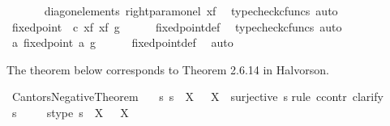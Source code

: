 \begin{isabellebody}
\ \ \ \ \isamarkupfalse%
\ \ diag{\isacharunderscore}{\kern0pt}on{\isacharunderscore}{\kern0pt}elements\ right{\isacharunderscore}{\kern0pt}param{\isacharunderscore}{\kern0pt}on{\isacharunderscore}{\kern0pt}el\ x{\isacharunderscore}{\kern0pt}f\ \isamarkupfalse%
\ {\isacharparenleft}{\kern0pt}typecheck{\isacharunderscore}{\kern0pt}cfuncs{\isacharcomma}{\kern0pt}\ auto{\isacharparenright}{\kern0pt}\isanewline
\ \ \isamarkupfalse%
\ \isamarkupfalse%
\ {\isachardoublequoteopen}fixed{\isacharunderscore}{\kern0pt}point\ {\isacharparenleft}{\kern0pt}{\isasymphi}\ {\isasymcirc}\isactrlsub c\ {\isasymlangle}x{\isacharunderscore}{\kern0pt}f{\isacharcomma}{\kern0pt}\ x{\isacharunderscore}{\kern0pt}f{\isasymrangle}{\isacharparenright}{\kern0pt}\ g{\isachardoublequoteclose}\isanewline
\ \ \ \ \isamarkupfalse%
\ fixed{\isacharunderscore}{\kern0pt}point{\isacharunderscore}{\kern0pt}def{}\ \isamarkupfalse%
\ {\isacharparenleft}{\kern0pt}typecheck{\isacharunderscore}{\kern0pt}cfuncs{\isacharcomma}{\kern0pt}\ auto{\isacharparenright}{\kern0pt}\isanewline
\ \ \isamarkupfalse%
\ \isamarkupfalse%
\ {\isachardoublequoteopen}{\isasymexists}a{\isachardot}{\kern0pt}\ fixed{\isacharunderscore}{\kern0pt}point\ a\ g{\isachardoublequoteclose}\isanewline
\ \ \ \ \isamarkupfalse%
\ fixed{\isacharunderscore}{\kern0pt}point{\isacharunderscore}{\kern0pt}def\ \isamarkupfalse%
\ auto\isanewline
{}\isamarkupfalse%
%
\endisatagproof
{\isafoldproof}%
%
\isadelimproof
%
\endisadelimproof
%
\begin{isamarkuptext}%
The theorem below corresponds to Theorem 2.6.14 in Halvorson.%
\end{isamarkuptext}\isamarkuptrue%
\isamarkupfalse%
\ Cantors{\isacharunderscore}{\kern0pt}Negative{\isacharunderscore}{\kern0pt}Theorem{\isacharcolon}{\kern0pt}\isanewline
\ \ {\isachardoublequoteopen}{\isasymnexists}\ s{\isachardot}{\kern0pt}\ s\ {\isacharcolon}{\kern0pt}\ X\ {\isasymrightarrow}\ {\isasymP}\ X\ {\isasymand}\ surjective\ s{\isachardoublequoteclose}\isanewline
%
\isadelimproof
%
\endisadelimproof
%
\isatagproof
{}\isamarkupfalse%
{\isacharparenleft}{\kern0pt}rule\ ccontr{\isacharcomma}{\kern0pt}\ clarify{\isacharparenright}{\kern0pt}\isanewline
\ \ \isamarkupfalse%
\ s\ \isanewline
\ \ \isamarkupfalse%
\ s{\isacharunderscore}{\kern0pt}type{\isacharcolon}{\kern0pt}\ {\isachardoublequoteopen}s\ {\isacharcolon}{\kern0pt}\ X\ {\isasymrightarrow}\ {\isasymP}\ X{\isachardoublequoteclose}\isanewline

\end{isabellebody}
